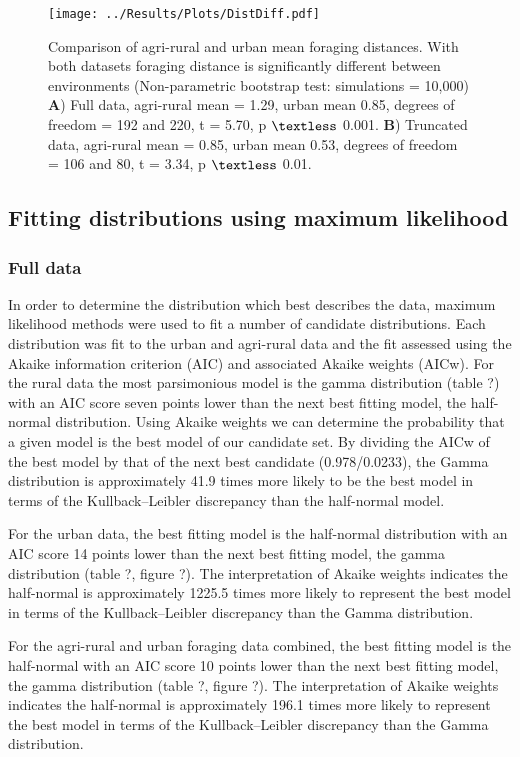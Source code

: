\documentclass[11pt,usenames,dvipsnames]{article}
\begin{document}
\begin{figure}[H]
	\centering
	\texttt{[image: ../Results/Plots/DistDiff.pdf]}
	\caption{Comparison of agri-rural and urban mean foraging distances. With both datasets foraging distance is significantly different between environments (Non-parametric bootstrap test: simulations = 10,000) \textbf{A}) Full data, agri-rural mean = 1.29, urban mean 0.85, degrees of freedom = 192 and 220, t = 5.70, p $\textless$ 0.001. \textbf{B}) Truncated data, agri-rural mean = 0.85, urban mean 0.53, degrees of freedom = 106 and 80, t = 3.34, p $\textless$ 0.01.}
\end{figure}

\subsection{Fitting distributions using maximum likelihood}

\subsubsection{Full data}
In order to determine the distribution which best describes the data, maximum likelihood methods were used to fit a number of candidate distributions. Each distribution was fit to the urban and agri-rural data and the fit assessed using the Akaike information criterion (AIC) and associated Akaike weights (AICw). For the rural data the most parsimonious model is the gamma distribution (table ?) with an AIC score seven points lower than the next best fitting model, the half-normal distribution. Using Akaike weights we can determine the probability that a given model is the best model of our candidate set. By dividing the AICw of the best model by that of the next best candidate (0.978/0.0233), the Gamma distribution is approximately 41.9 times more likely to be the best model in terms of the Kullback–Leibler discrepancy than the half-normal model.

For the urban data, the best fitting model is the half-normal distribution with an AIC score 14 points lower than the next best fitting model, the gamma distribution (table ?, figure ?). The interpretation of Akaike weights indicates the half-normal is approximately 1225.5 times more likely to represent the best model in terms of the Kullback–Leibler discrepancy than the Gamma distribution.

For the agri-rural and urban foraging data combined, the best fitting model is the half-normal with an AIC score 10 points lower than the next best fitting model, the gamma distribution (table ?, figure ?). The interpretation of Akaike weights indicates the half-normal is approximately 196.1 times more likely to represent the best model in terms of the Kullback–Leibler discrepancy than the Gamma distribution.
\end{document}
